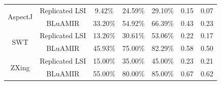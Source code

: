 \documentclass[conference]{IEEEtran}
\begin{document}
\begin{table}[htbp]
{\begin{tabular}{c|c|c|c|c|c|c}
			\multirow{2}{*}{AspectJ}       &Replicated LSI     &  9.42\%& 24.59\%&29.10\%& 0.15 & 0.07  \\ \cline{2-7}
			& BLuAMIR                                                                                                                     & 33.20\%                                                 & 54.92\%                                                 & 66.39\%                                                  &   0.43  &  0.23    \\ 
			\hline
			\multirow{2}{*}{SWT}       &Replicated LSI     &  13.26\%& 30.61\%&53.06\%& 0.22 & 0.17  \\ \cline{2-7}
			& BLuAMIR                                                                                                                     & 45.93\%                                                 & 75.00\%                                                 & 82.29\%                                                  &   0.58  &  0.50    \\ 
			\hline
			\multirow{2}{*}{ZXing}       &Replicated LSI     &  15.00\%& 35.00\%&45.00\%& 0.23 & 0.21  \\ \cline{2-7}
			& BLuAMIR                                                                                                                     & 55.00\%                                                 & 80.00\%                                                 & 85.00\%                                                  &   0.67  &  0.62    \\ 
			\hline
	\end{tabular}}
	\centering
\end{table}
\end{document}
